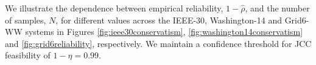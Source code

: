 We illustrate the dependence between empirical reliability, $1-\hat{\rho}$, and the number of samples, $N$, for different values across the IEEE-30, Washington-14 and Grid6-WW systems in Figures \ref{fig:ieee30conservatism},  \ref{fig:washington14conservatism} and \ref{fig:grid6reliability}, respectively. We maintain a confidence threshold for JCC feasibility of $1-\eta = 0.99$. 
